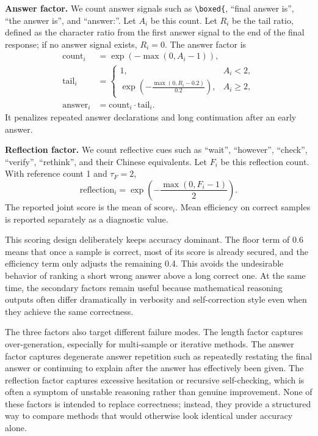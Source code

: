 \documentclass[conference]{IEEEtran}
\begin{document}
\textbf{Answer factor.} We count answer signals such as \texttt{\textbackslash boxed\{}, ``final answer is'', ``the answer is'', and ``answer:''. Let $A_i$ be this count. Let $R_i$ be the tail ratio, defined as the character ratio from the first answer signal to the end of the final response; if no answer signal exists, $R_i=0$. The answer factor is
\begin{align}
\text{count}_i &= \exp\left(-\max(0,A_i-1)\right),\\
\text{tail}_i &= 
\begin{cases}
1, & A_i < 2,\\
\exp\left(-\frac{\max(0,R_i-0.2)}{0.2}\right), & A_i \ge 2,
\end{cases}\\
\text{answer}_i &= \text{count}_i \cdot \text{tail}_i.
\end{align}
It penalizes repeated answer declarations and long continuation after an early answer.

\textbf{Reflection factor.} We count reflective cues such as ``wait'', ``however'', ``check'', ``verify'', ``rethink'', and their Chinese equivalents. Let $F_i$ be this reflection count. With reference count 1 and $\tau_F=2$,
\begin{equation}
\text{reflection}_i=\exp\left(-\frac{\max(0,F_i-1)}{2}\right).
\end{equation}
The reported joint score is the mean of $\text{score}_i$. Mean efficiency on correct samples is reported separately as a diagnostic value.

This scoring design deliberately keeps accuracy dominant. The floor term of 0.6 means that once a sample is correct, most of its score is already secured, and the efficiency term only adjusts the remaining 0.4. This avoids the undesirable behavior of ranking a short wrong answer above a long correct one. At the same time, the secondary factors remain useful because mathematical reasoning outputs often differ dramatically in verbosity and self-correction style even when they achieve the same correctness.

The three factors also target different failure modes. The length factor captures over-generation, especially for multi-sample or iterative methods. The answer factor captures degenerate answer repetition such as repeatedly restating the final answer or continuing to explain after the answer has effectively been given. The reflection factor captures excessive hesitation or recursive self-checking, which is often a symptom of unstable reasoning rather than genuine improvement. None of these factors is intended to replace correctness; instead, they provide a structured way to compare methods that would otherwise look identical under accuracy alone.
\end{document}
